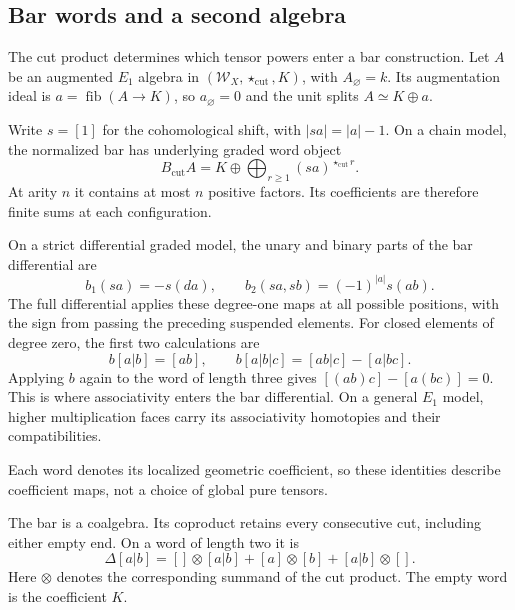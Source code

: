\subsection{Bar words and a second algebra}
\label{ogd:sec:first-cut-words}

The cut product determines which tensor powers enter a bar construction.
Let\label{ogd:def:augmented-cut-algebra} $A$ be an augmented $E_1$ algebra in
$(\mathcal W_X,\star_{\mathrm{cut}},K)$, with $A_\varnothing=k$.
Its augmentation ideal is $a=\operatorname{fib}(A\to K)$, so
$a_\varnothing=0$ and the unit splits $A\simeq K\oplus a$.

Write\label{ogd:def:cut-bar-suspension} $s=[1]$ for the cohomological shift, with $|sa|=|a|-1$.
On a chain model, the normalized bar has underlying graded word object
\begin{equation}\label{ogd:eq:first-cut-bar}
 B_{\mathrm{cut}}A
   =K\oplus\bigoplus_{r\geq1}(sa)^{\star_{\mathrm{cut}}r}.
\end{equation}
At arity $n$ it contains at most $n$ positive factors.
Its coefficients are therefore finite sums at each configuration.

On\label{ogd:def:cut-bar-differential} a strict differential graded model, the unary and binary parts of
the bar differential are
\[
 b_1(sa)=-s(da),\qquad b_2(sa,sb)=(-1)^{|a|}s(ab).
\]
The full differential applies these degree-one maps at all possible
positions, with the sign from passing the preceding suspended elements.
For closed elements of degree zero, the first two calculations are
\begin{equation}\label{ogd:eq:first-cut-bar-faces}
 b[a|b]=[ab],\qquad
 b[a|b|c]=[ab|c]-[a|bc].
\end{equation}
Applying $b$ again to the word of length three gives
$[(ab)c]-[a(bc)]=0$. This is where associativity enters the bar
differential. On a general $E_1$ model, higher multiplication faces
carry its associativity homotopies and their compatibilities.

Each word denotes its localized geometric coefficient, so these
identities describe coefficient maps, not a choice of global pure tensors.

The bar is a coalgebra. Its coproduct retains every consecutive cut,
including either empty end. On a word of length two it is
\begin{equation}\label{ogd:eq:first-cut-deconcatenation}
 \Delta[a|b]
 =[]\otimes[a|b]+[a]\otimes[b]+[a|b]\otimes[].
\end{equation}
Here $\otimes$ denotes the corresponding summand of the cut product.
The empty word is the coefficient $K$.

